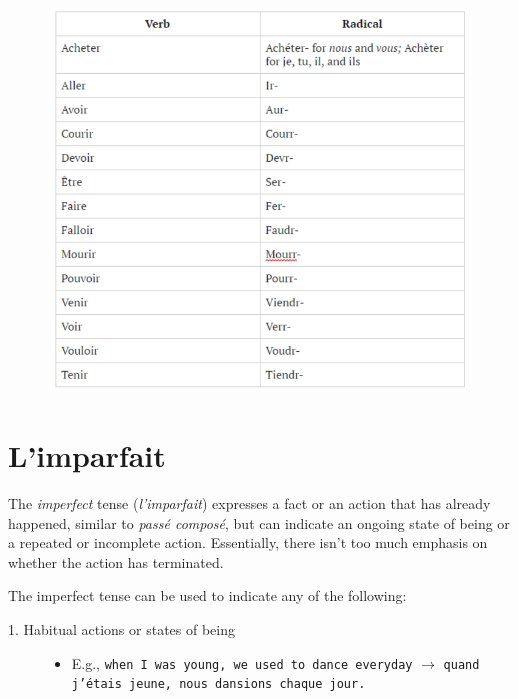 \documentclass[11pt, oneside]{book}
\begin{document}
{\begin{figure}[H]
	\includegraphics[scale=0.5]{charts/futurIrregular.png}
\end{figure} \vspace{0.5\baselineskip}


\section{L'imparfait}

The \textit{imperfect} tense (\textit{l'imparfait}) expresses a fact or an action that has already happened, similar to \textit{pass\'e compos\'e}, but can indicate an ongoing state of being or a repeated or incomplete action. Essentially, there isn't too much emphasis on whether the action has terminated. \vspace{0.5\baselineskip}

The imperfect tense can be used to indicate any of the following:

\begin{description}
	\item[1. Habitual actions or states of being] 

		\begin{itemize}
			\textcolor{white}{a} 
			\item[] E.g., \texttt{when I was young, we used to dance everyday} $\rightarrow$ \texttt{quand j'\'etais jeune, nous dansions chaque jour.}
		\end{itemize}
		

\end{description}}
\end{document}

